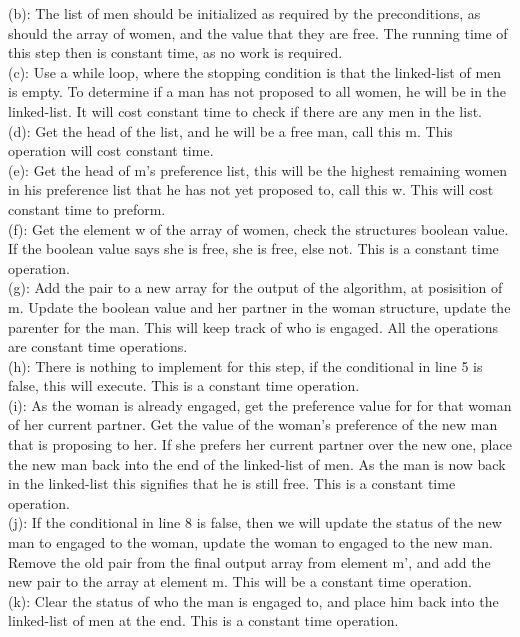 \documentclass{assignment}
\begin{document}
\begin{problemlist}
\begin{answer}
(b): The list of men should be initialized as required by the preconditions, as should the array of women, and the value that they are free. The running time of this step then is constant time, as no work is required.\\
(c): Use a while loop, where the stopping condition is that the linked-list of men is empty. To determine if a man has not proposed to all women, he will be in the linked-list. It will cost constant time to check if there are any men in the list.\\
\clearpage
(d): Get the head of the list, and he will be a free man, call this m. This operation will cost constant time.\\
(e): Get the head of m's preference list, this will be the highest remaining women in his preference list that he has not yet proposed to, call this w. This will cost constant time to preform.\\
(f): Get the element w of the array of women, check the structures boolean value. If the boolean value says she is free, she is free, else not. This is a constant time operation.\\
(g): Add the pair to a new array for the output of the algorithm, at posisition of m. Update the boolean value and her partner in the woman structure, update the parenter for the man. This will keep track of who is engaged. All the operations are constant time operations.\\
(h): There is nothing to implement for this step, if the conditional in line 5 is false, this will execute. This is a constant time operation.\\
(i): As the woman is already engaged, get the preference value for for that woman of her current partner. Get the value of the woman's preference of the new man that is proposing to her. If she prefers her current partner over the new one, place the new man back into the end of the linked-list of men. As the man is now back in the linked-list this signifies that he is still free. This is a constant time operation.\\
(j): If the conditional in line 8 is false, then we will update the status of the new man to engaged to the woman, update the woman to engaged to the new man. Remove the old pair from the final output array from element m', and add the new pair to the array at element m. This will be a constant time operation.\\
(k): Clear the status of who the man is engaged to, and place him back into the linked-list of men at the end. This is a constant time operation.\\

\end{answer}
\end{problemlist}
\end{document}
